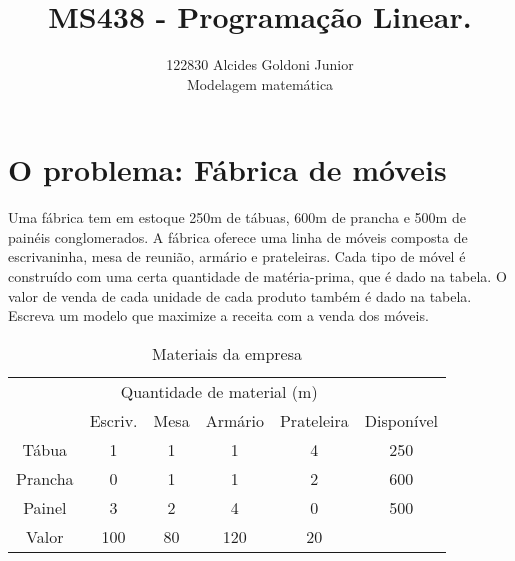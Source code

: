 \documentclass[a4paper]{article}
\title{MS438 - Programa\c{c}\~ao Linear.}
\author{122830 Alcides Goldoni Junior\\
  \small Modelagem matem\'{a}tica \\
}%
\begin{document}
\maketitle
\section{O problema: F\'abrica de m\'oveis}
Uma f\'abrica tem em estoque 250m de t\'abuas, 600m de prancha e 500m de pain\'eis conglomerados. A f\'abrica oferece uma linha de m\'oveis composta de escrivaninha, mesa de reuni\~ao, arm\'ario e prateleiras. Cada tipo de m\'ovel é constru\'ido com uma certa quantidade de mat\'eria-prima, que \'e dado na tabela. O valor de venda de cada unidade de cada produto tamb\'em é dado na tabela.
\\
Escreva um modelo que maximize a receita com a venda dos m\'oveis.
\\
\begin{table}[]
\centering
\caption{Materiais da empresa}
\label{my-label}
\begin{tabular}{c|c|c|c|c|c}
\cline{2-5}
& \multicolumn{4}{c|}{Quantidade de material (m)} & \\ 
\cline{2-6} 
& Escriv.    & Mesa    & Arm\'ario   & Prateleira   & \multicolumn{1}{c|}{Dispon\'ivel} \\ 
\hline
\multicolumn{1}{|c|}{T\'abua}   & 1          & 1       & 1         & 4            & \multicolumn{1}{c|}{250}        \\ \hline
\multicolumn{1}{|c|}{Prancha} & 0          & 1       & 1         & 2            & \multicolumn{1}{c|}{600}        \\ \hline
\multicolumn{1}{|c|}{Painel}  & 3          & 2       & 4         & 0            & \multicolumn{1}{c|}{500}        \\ \hline
\multicolumn{1}{|c|}{Valor}   & 100        & 80      & 120       & 20           &                                 \\ \cline{1-5}
\end{tabular}
\end{table}
\\
\end{document}
